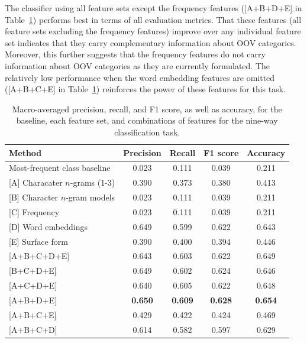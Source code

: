 \documentclass[10pt, a4paper]{article}
\newcommand{\tabref}[2][]{Table#1~\ref{#2}\xspace}
\begin{document}
The classifier using all feature sets except the frequency features
([A+B+D+E] in \tabref{tbl:results}) performs best in terms of all
evaluation metrics. That these features (all feature sets excluding
the frequency features) improve over any individual feature set
indicates that they carry complementary information about OOV
categories. Moreover, this further suggests that the frequency
features do not carry information about OOV categories as they are
currently formulated.  The relatively low performance when the word
embedding features are omitted ([A+B+C+E] in \tabref{tbl:results})
reinforces the power of these features for this task.





\begin{table}
\begin{center}
\begin{tabular}{lcccc}

\textbf{Method}& \textbf{Precision}&\textbf{Recall}
&\textbf{F1 score}&\textbf{Accuracy}\\
 \hline
Most-frequent class baseline & 0.023 & 0.111 & 0.039 & 0.211 \\

\hline

[A] Characater $n$-grams (1-3) & 0.390 & 0.373 & 0.380 & 0.413\\

[B] Character $n$-gram models & 0.023 & 0.111 & 0.039 & 0.211 \\

[C] Frequency & 0.023 & 0.111 & 0.039 & 0.211 \\

[D] Word embeddings & 0.649 & 0.599 & 0.622 & 0.643 \\

[E] Surface form & 0.390 & 0.400 & 0.394 & 0.446 \\ 

[A+B+C+D+E] & 0.643 & 0.603 & 0.622 & 0.649 \\

[B+C+D+E] & 0.649 & 0.602 & 0.624 & 0.646 \\

[A+C+D+E] & 0.640 & 0.605 & 0.622 & 0.648 \\

[A+B+D+E] & \textbf{0.650} & \textbf{0.609} & \textbf{0.628} & \textbf{0.654} \\

[A+B+C+E] & 0.429 & 0.422 & 0.424 & 0.469 \\

[A+B+C+D] & 0.614 & 0.582 & 0.597 & 0.629 \\
\end{tabular}
\caption{Macro-averaged precision, recall, and F1 score, as well as
  accuracy, for the baseline, each feature set, and combinations of
  features for the nine-way classification task.\label{tbl:results}}
\end{center}
\end{table}
\end{document}
